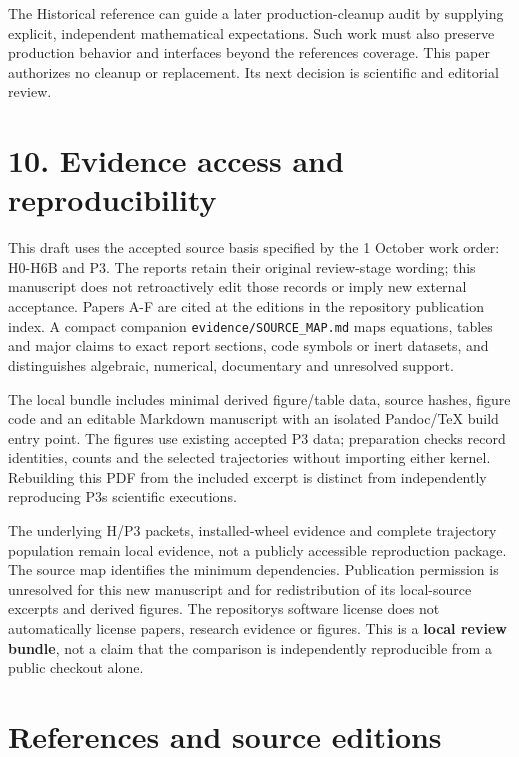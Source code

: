 \documentclass[
  11pt,
  a4paper,
]{article}
\begin{document}
The Historical reference can guide a later production-cleanup audit by supplying explicit, independent mathematical expectations. Such work must also preserve production behavior and interfaces beyond the reference\textquotesingle s coverage. This paper authorizes no cleanup or replacement. Its next decision is scientific and editorial review.

\section{10. Evidence access and reproducibility}\label{evidence-access-and-reproducibility}

This draft uses the accepted source basis specified by the 1 October work order: H0-H6B and P3. The reports retain their original review-stage wording; this manuscript does not retroactively edit those records or imply new external acceptance. Papers A-F are cited at the editions in the repository publication index. A compact companion \nolinkurl{evidence/SOURCE_MAP.md} maps equations, tables and major claims to exact report sections, code symbols or inert datasets, and distinguishes algebraic, numerical, documentary and unresolved support.

The local bundle includes minimal derived figure/table data, source hashes, figure code and an editable Markdown manuscript with an isolated Pandoc/TeX build entry point. The figures use existing accepted P3 data; preparation checks record identities, counts and the selected trajectories without importing either kernel. Rebuilding this PDF from the included excerpt is distinct from independently reproducing P3\textquotesingle s scientific executions.

The underlying H/P3 packets, installed-wheel evidence and complete trajectory population remain local evidence, not a publicly accessible reproduction package. The source map identifies the minimum dependencies. Publication permission is unresolved for this new manuscript and for redistribution of its local-source excerpts and derived figures. The repository\textquotesingle s software license does not automatically license papers, research evidence or figures. This is a \textbf{local review bundle}, not a claim that the comparison is independently reproducible from a public checkout alone.

\section{References and source editions}\label{references-and-source-editions}
\end{document}

